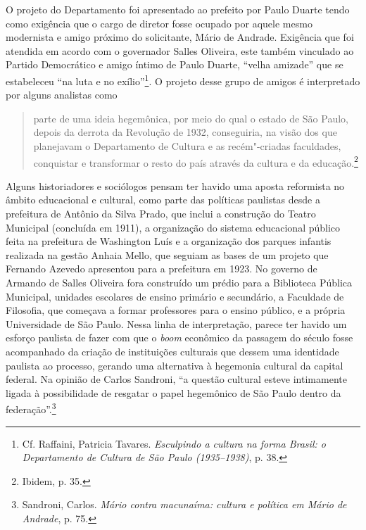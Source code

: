O projeto do Departamento foi apresentado ao prefeito por Paulo Duarte
tendo como exigência que o cargo de diretor fosse ocupado por aquele
mesmo modernista e amigo próximo do solicitante, Mário de Andrade.
Exigência que foi atendida em acordo com o governador Salles Oliveira,
este também vinculado ao Partido Democrático e amigo íntimo de Paulo
Duarte, ``velha amizade'' que se estabeleceu ``na luta e no
exílio''\footnote{Cf. Raffaini, Patricia Tavares. \emph{Esculpindo a
  cultura na forma Brasil: o Departamento de Cultura de São Paulo
  (1935--1938)}, p. 38.}. O projeto desse grupo de amigos é interpretado
por alguns analistas como

\begin{quote}
parte de uma ideia hegemônica, por meio do qual o estado de São Paulo,
depois da derrota da Revolução de 1932, conseguiria, na visão dos que
planejavam o Departamento de Cultura e as recém"-criadas faculdades,
conquistar e transformar o resto do país através da cultura e da
educação.\footnote{Ibidem, p. 35.}
\end{quote}

Alguns historiadores e sociólogos pensam ter havido uma aposta
reformista no âmbito educacional e cultural, como parte das políticas
paulistas desde a prefeitura de Antônio da Silva Prado, que inclui a
construção do Teatro Municipal (concluída em 1911), a organização do
sistema educacional público feita na prefeitura de Washington Luís e a
organização dos parques infantis realizada na gestão Anhaia Mello, que
seguiam as bases de um projeto que Fernando Azevedo apresentou para a
prefeitura em 1923. No governo de Armando de Salles Oliveira fora
construído um prédio para a Biblioteca Pública Municipal, unidades
escolares de ensino primário e secundário, a Faculdade de Filosofia, que
começava a formar professores para o ensino público, e a própria
Universidade de São Paulo. Nessa linha de interpretação, parece ter
havido um esforço paulista de fazer com que o \emph{boom} econômico da
passagem do século fosse acompanhado da criação de instituições
culturais que dessem uma identidade paulista ao processo, gerando uma
alternativa à hegemonia cultural da capital federal. Na opinião de
Carlos Sandroni, ``a questão cultural esteve intimamente ligada à
possibilidade de resgatar o papel hegemônico de São Paulo dentro da
federação''.\footnote{Sandroni, Carlos. \emph{Mário contra macunaíma:
  cultura e política em Mário de Andrade}, p. 75.}

